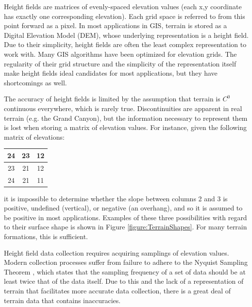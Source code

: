 Height fields are matrices of evenly-spaced elevation values (each x,y coordinate has exactly one corresponding elevation). Each grid space is referred to from this point forward as a pixel. 
In most applications in GIS, terrain is stored as a Digital Elevation Model (DEM), whose underlying representation is a height field. Due to their simplicity, height fields are often the least complex representation to work with. Many GIS algorithms have been optimized for elevation grids. The regularity of their grid structure and the simplicity of the representation itself make height fields ideal candidates for most applications, but they have shortcomings as well.

The accuracy of height fields is limited by the assumption that terrain is $C^{0}$ continuous everywhere,
which is rarely true.
Discontinuities are apparent in real terrain (e.g. the Grand Canyon), but the information necessary to represent them is lost when storing a matrix of elevation values. For instance, given the following matrix of elevations:

\begin{center}
  \begin{tabular}{c|c|c}
    24 & 23 & 12 \\
    \hline
    23 & 21 & 12 \\
    \hline
    24 & 21 & 11 
  \end{tabular} 
\end{center}

\noindent it is impossible to determine whether the slope between columns 2 and 3 is positive, undefined (vertical), or negative (an overhang), and so it is assumed to be positive in most applications. 
Examples of these three possibilities with regard to their surface shape is shown in Figure \ref{figure:TerrainShapes}.
For many terrain formations, this is 
sufficient.

Height field data collection requires acquiring samplings of elevation values. Modern collection processes suffer from failure to adhere to the Nyquist Sampling Theorem \cite{nyquist}, which states that the sampling frequency of a set of data should be at least twice that of the data itself. Due to this and the lack of a representation of terrain that facilitates more accurate data collection, there is a great deal of terrain data that contains inaccuracies.

